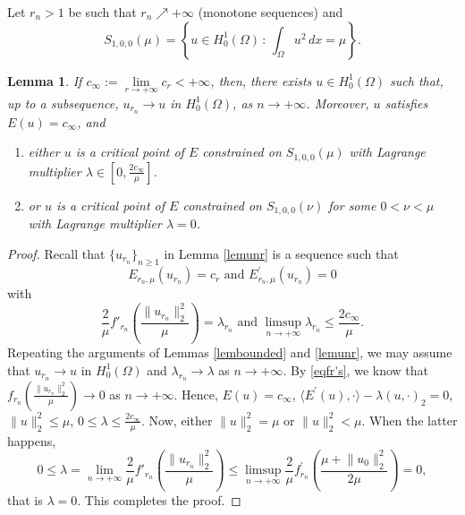 \documentclass[11pt]{amsart}
\newtheorem{lemma}[theorem]{Lemma}
\newcommand{\norm}[1]{\lVert#1\rVert}
\numberwithin{equation}{section}
\begin{document}
Let $r_{n}>1$ be such that $r_{n} \nearrow +\infty$ (monotone sequences) and
$$
S_{1,0,0}(\mu)=\left\{u \in H_0^{1}(\Omega)\,:\,\int_{\Omega}u^2\,dx=\mu\right\}.
$$
\begin{lemma}\label{lemur}
     If  $c_\infty:=\lim\limits_{r\to+\infty} c_r <+\infty$, then, there exists $u \in H^1_0(\Omega)$ such that, up to a subsequence, $u_{r_n} \to u$ in $H^1_0(\Omega)$, as $n \to +\infty$. Moreover, $u$ satisfies $E(u)=c_\infty$, and
     \begin{enumerate}[label=\rm(\roman*)]
        \item either $u$ is a critical point of $E$ constrained on $S_{1,0,0}(\mu)$ with Lagrange multiplier $\lambda \in [0,\frac{2c_\infty}{\mu}]$.
\item  or $u$ is a critical point of $E$ constrained on $S_{1,0,0}(\nu)$ for some $0<\nu < \mu$ with Lagrange multiplier $\lambda =0$.
    \end{enumerate}
\end{lemma}
\begin{proof}
    Recall that $\{u_{r_n}\}_{n\geq 1}$ in Lemma \ref{lemunr} is a sequence such that
$$
E_{r_{n}, \mu}(u_{r_{n}})=c_{r} \text{ and } E_{r_{n}, \mu}^{\prime}(u_{r_{n}})=0
$$
with
$$
 \frac{2}{\mu}f'_{r_n}\left(\frac{\norm{u_{r_n}}_2^2}{\mu}\right) = \lambda_{r_n}  \text{ and } \limsup_{n \to +\infty}\lambda_{r_n} \leq \frac{2c_\infty}{\mu}.
$$
Repeating the arguments of Lemmas \ref{lembounded} and \ref{lemunr}, we may assume that $u_{r_n} \to u$ in $H^1_0(\Omega)$ and $\lambda_{r_n} \rightarrow \lambda$ as $n \to +\infty$. By \eqref{eqfr's}, we know that $f_{r_n}\left(\frac{\norm{u_{r_n}}_2^2}{\mu}\right) \to 0$ as $n \to +\infty$. Hence,
$E(u) = c_\infty$, $ \langle  E^{\prime}(u), \cdot\rangle-\lambda(u,\cdot)_2 = 0$, $\norm{u}^2_{2} \leq \mu$, $0 \leq \lambda \leq \frac{2c_\infty}{\mu}$.
Now, either $\norm{u}^2_{2}=\mu$ or $\norm{u}_{2}^2<\mu$. When the latter happens,
$$
0 \leq \lambda=\lim _{n \to +\infty}\frac{2}{\mu}f'_{r_n}\left(\frac{\norm{u_{r_n}}_2^2}{\mu}\right) \leq \limsup _{n \to +\infty} \frac{2}{\mu}f_{r_{n}}^{\prime}\left(\frac{\mu+\norm{u_{0}}_{2}^{2}}{2\mu}\right)=0,
$$
that is $\lambda=0$. This completes the proof.
\end{proof}
\end{document}
